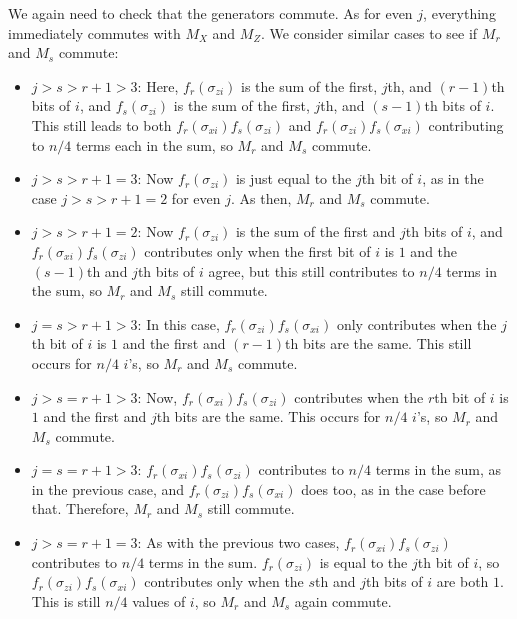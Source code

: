\documentclass{report}
\newcommand{\Xs}[1]{\sigma_{x{#1}}}
\newcommand{\Zs}[1]{\sigma_{z{#1}}}
\begin{document}
We again need to check that the generators commute.  As for even $j$, 
everything immediately commutes with $M_X$ and $M_Z$.  We consider 
similar cases to see if $M_r$ and $M_s$ commute:
\begin{itemize}

\item $j > s > r+1 > 3$: Here, $f_r (\Zs{i})$ is the sum of the first, $j$th, 
and $(r-1)$th bits of $i$, and $f_s (\Zs{i})$ is the sum of the first, $j$th, 
and $(s-1)$th bits of $i$.  This still leads to both $f_r (\Xs{i}) f_s (\Zs{i})$
and $f_r (\Zs{i}) f_s (\Xs{i})$ contributing to $n/4$ terms each in the sum, so 
$M_r$ and $M_s$ commute.

\item $j > s > r+1 = 3$: Now $f_r (\Zs{i})$ is just equal to the $j$th bit of 
$i$, as in the case $j > s > r+1 = 2$ for even $j$.  As then, $M_r$ and $M_s$ 
commute.

\item $j > s > r+1 = 2$: Now $f_r (\Zs{i})$ is the sum of the first and $j$th 
bits of $i$, and $f_r (\Xs{i}) f_s (\Zs{i})$ contributes only when the first 
bit of $i$ is $1$ and the $(s-1)$th and $j$th bits of $i$ agree, but this still 
contributes to $n/4$ terms in the sum, so $M_r$ and $M_s$ still commute.

\item $j = s > r+1 > 3$: In this case, $f_r (\Zs{i}) f_s (\Xs{i})$ only 
contributes when the $j$th bit of $i$ is $1$ and the first and $(r-1)$th bits 
are the same.  This still occurs for $n/4$ $i$'s, so $M_r$ and $M_s$ commute.

\item $j > s = r+1 > 3$: Now, $f_r (\Xs{i}) f_s (\Zs{i})$ contributes when the 
$r$th bit of $i$ is $1$ and the first and $j$th bits are the same.  This 
occurs for $n/4$ $i$'s, so $M_r$ and $M_s$ commute.

\item $j = s = r+1 > 3$: $f_r (\Xs{i}) f_s (\Zs{i})$ contributes to $n/4$ terms
in the sum, as in the previous case, and $f_r (\Zs{i}) f_s (\Xs{i})$ does too, 
as in the case before that.  Therefore, $M_r$ and $M_s$ still commute.

\item $j > s = r+1 = 3$: As with the previous two cases, $f_r (\Xs{i}) f_s 
(\Zs{i})$ contributes to $n/4$ terms in the sum.  $f_r (\Zs{i})$ is equal to 
the $j$th bit of $i$, so $f_r (\Zs{i}) f_s (\Xs{i})$ contributes only when the 
$s$th and $j$th bits of $i$ are both $1$. This is still $n/4$ values of $i$, so 
$M_r$ and $M_s$ again commute.


\end{itemize}
\end{document}
